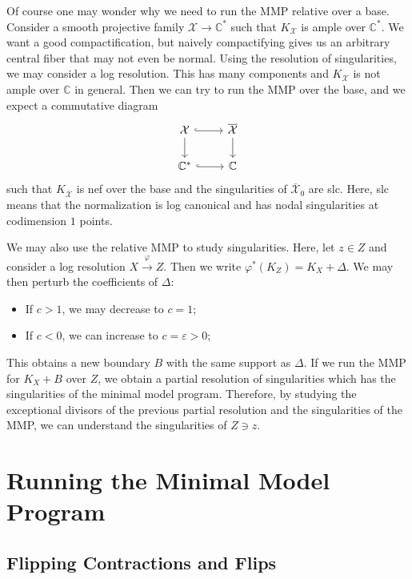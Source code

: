 \documentclass[leqno, openany]{memoir}
\theoremstyle{definition}
\theoremstyle{remark}
\theoremstyle{plain}
\theoremstyle{definition}
\theoremstyle{remark}
\newcommand{\C}{\mathbb{C}}
\newcommand{\ep}{\varepsilon}
\newcommand{\mc}[1]{\mathcal{#1}}
\newcommand{\ol}[1]{\overline{#1}}
\begin{document}
Of course one may wonder why we need to run the MMP relative over a base. Consider a smooth projective family $\mc{X} \to \C^*$ such that $K_{\mc{X}}$ is ample over $\C^*$. We want a good compactification, but naively compactifying gives us an arbitrary central fiber that may not even be normal. Using the resolution of singularities, we may consider a log resolution. This has many components and $K_{\mc{X}}$ is not ample over $\C$ in general. Then we can try to run the MMP over the base, and we expect a commutative diagram
\begin{equation*}
\begin{tikzcd}
    \mc{X} \ar[hookrightarrow]{r} \ar{d} & \ol{\mc{X}} \ar{d} \\
    \C^* \ar[hookrightarrow]{r} & \C
\end{tikzcd}
\end{equation*}
such that $K_{\ol{\mc{X}}}$ is nef over the base and the singularities of $\ol{\mc{X}}_0$ are slc. Here, slc means that the normalization is log canonical and has nodal singularities at codimension $1$ points.

We may also use the relative MMP to study singularities. Here, let $z \in Z$ and consider a log resolution $X \xrightarrow{\varphi} Z$. Then we write $\varphi^*(K_Z) = K_X + \Delta$. We may then perturb the coefficients of $\Delta$:
\begin{itemize}
    \item If $c > 1$, we may decrease to $c = 1$;
    \item If $c < 0$, we can increase to $c = \ep > 0$;
\end{itemize}
This obtains a new boundary $B$ with the same support as $\Delta$. If we run the MMP for $K_X + B$ over $Z$, we obtain a partial resolution of singularities which has the singularities of the minimal model program. Therefore, by studying the exceptional divisors of the previous partial resolution and the singularities of the MMP, we can understand the singularities of $Z \ni z$.

\section{Running the Minimal Model Program}%
\label{sec:running_the_minimal_model_program}

\subsection{Flipping Contractions and Flips}%
\label{sub:flipping_contractions_and_flips}
\end{document}
